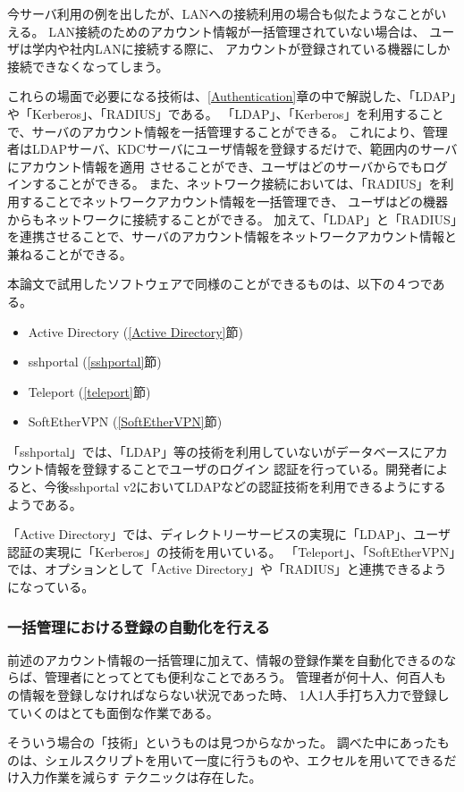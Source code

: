 \documentclass[11pt,a4j,titlepage]{jreport}
\begin{document}
今サーバ利用の例を出したが、LANへの接続利用の場合も似たようなことがいえる。
LAN接続のためのアカウント情報が一括管理されていない場合は、 ユーザは学内や社内LANに接続する際に、
アカウントが登録されている機器にしか接続できなくなってしまう。

これらの場面で必要になる技術は、\ref{Authentication}章の中で解説した、「LDAP」や「Kerberos」、「RADIUS」である。
「LDAP」、「Kerberos」を利用することで、サーバのアカウント情報を一括管理することができる。
これにより、管理者はLDAPサーバ、KDCサーバにユーザ情報を登録するだけで、範囲内のサーバにアカウント情報を適用
させることができ、ユーザはどのサーバからでもログインすることができる。
また、ネットワーク接続においては、「RADIUS」を利用することでネットワークアカウント情報を一括管理でき、
ユーザはどの機器からもネットワークに接続することができる。
加えて、「LDAP」と「RADIUS」を連携させることで、サーバのアカウント情報をネットワークアカウント情報と兼ねることができる。

\par 本論文で試用したソフトウェアで同様のことができるものは、以下の４つである。
\begin{itemize}
    \item Active Directory (\ref{Active Directory}節)
    \item sshportal (\ref{sshportal}節)
    \item Teleport (\ref{teleport}節)
    \item SoftEtherVPN (\ref{SoftEtherVPN}節)
\end{itemize}

「sshportal」では、「LDAP」等の技術を利用していないがデータベースにアカウント情報を登録することでユーザのログイン
認証を行っている。開発者によると、今後sshportal v2においてLDAPなどの認証技術を利用できるようにするようである。

「Active Directory」では、ディレクトリーサービスの実現に「LDAP」、ユーザ認証の実現に「Kerberos」の技術を用いている。
「Teleport」、「SoftEtherVPN」では、オプションとして「Active Directory」や「RADIUS」と連携できるようになっている。

\subsubsection*{一括管理における登録の自動化を行える}
前述のアカウント情報の一括管理に加えて、情報の登録作業を自動化できるのならば、管理者にとってとても便利なことであろう。
管理者が何十人、何百人もの情報を登録しなければならない状況であった時、
1人1人手打ち入力で登録していくのはとても面倒な作業である。
\par そういう場合の「技術」というものは見つからなかった。
調べた中にあったものは、シェルスクリプトを用いて一度に行うものや、エクセルを用いてできるだけ入力作業を減らす
テクニックは存在した。
\end{document}
